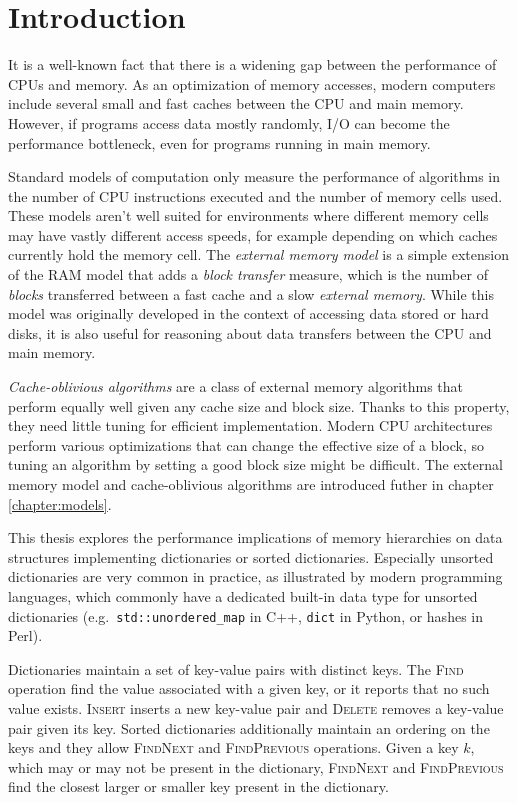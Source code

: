 \chapter*{Introduction}

It is a well-known fact that there is a widening gap between
the performance of CPUs and memory. As an optimization of memory accesses,
modern computers include several small and fast caches between the CPU and
main memory. However, if programs access data mostly randomly, I/O can become
the performance bottleneck, even for programs running in main memory.

Standard models of computation only measure the performance of algorithms
in the number of CPU instructions executed and the number of memory cells used.
These models aren't well suited for environments where different memory cells
may have vastly different access speeds, for example depending on which caches
currently hold the memory cell. The \emph{external memory model} is a simple
extension of the RAM model that adds a \emph{block transfer} measure, which
is the number of \emph{blocks} transferred between a fast cache and a slow
\emph{external memory}. While this model was originally developed
in the context of accessing data stored or hard disks, it is also useful
for reasoning about data transfers between the CPU and main memory.

\emph{Cache-oblivious algorithms} are a class of external memory algorithms
that perform equally well given any cache size and block size. Thanks to this
property, they need little tuning for efficient implementation.
Modern CPU architectures perform various optimizations that can change
the effective size of a block, so tuning an algorithm by setting a good block
size might be difficult.
The external memory model and cache-oblivious algorithms are introduced futher
in chapter \ref{chapter:models}.

This thesis explores the performance implications of memory hierarchies
on data structures implementing dictionaries or sorted dictionaries.
Especially unsorted dictionaries are very common in practice, as illustrated
by modern programming languages, which commonly have a dedicated built-in
data type for unsorted dictionaries (e.g.\ \texttt{std::unordered\_map} in C++,
\texttt{dict} in Python, or hashes in Perl).

Dictionaries maintain a set of key-value pairs with distinct keys.
The \textsc{Find} operation find the value associated with a given key, or
it reports that no such value exists. \textsc{Insert} inserts a new
key-value pair and \textsc{Delete} removes a key-value pair given its key.
Sorted dictionaries additionally maintain an ordering on the keys and they
allow \textsc{FindNext} and \textsc{FindPrevious} operations.
Given a key $k$, which may or may not be present in the dictionary,
\textsc{FindNext} and \textsc{FindPrevious} find the closest larger or smaller
key present in the dictionary.

